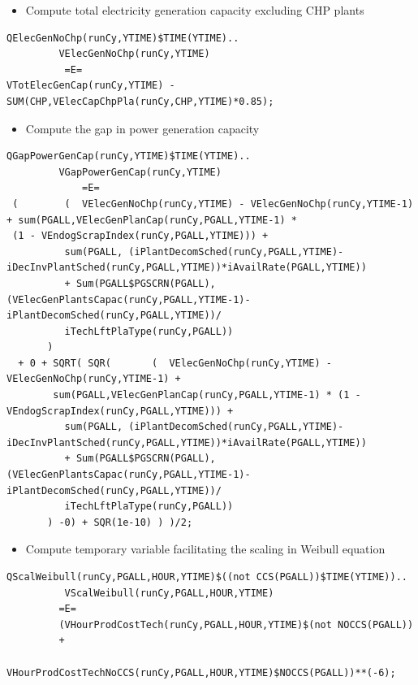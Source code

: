 \documentclass[a4paper,]{scrartcl}
\providecommand{\tightlist}{%
  \setlength{\itemsep}{0pt}\setlength{\parskip}{0pt}}
\begin{document}
\begin{itemize}
\tightlist
\item
  Compute total electricity generation capacity excluding CHP plants
\end{itemize}

\begin{lstlisting}
QElecGenNoChp(runCy,YTIME)$TIME(YTIME)..
         VElecGenNoChp(runCy,YTIME)
          =E=
VTotElecGenCap(runCy,YTIME) - SUM(CHP,VElecCapChpPla(runCy,CHP,YTIME)*0.85);      
\end{lstlisting}

\begin{itemize}
\tightlist
\item
  Compute the gap in power generation capacity
\end{itemize}

\begin{lstlisting}
QGapPowerGenCap(runCy,YTIME)$TIME(YTIME)..
         VGapPowerGenCap(runCy,YTIME)
             =E=
 (        (  VElecGenNoChp(runCy,YTIME) - VElecGenNoChp(runCy,YTIME-1) + sum(PGALL,VElecGenPlanCap(runCy,PGALL,YTIME-1) * 
 (1 - VEndogScrapIndex(runCy,PGALL,YTIME))) +
          sum(PGALL, (iPlantDecomSched(runCy,PGALL,YTIME)-iDecInvPlantSched(runCy,PGALL,YTIME))*iAvailRate(PGALL,YTIME))
          + Sum(PGALL$PGSCRN(PGALL), (VElecGenPlantsCapac(runCy,PGALL,YTIME-1)-iPlantDecomSched(runCy,PGALL,YTIME))/
          iTechLftPlaType(runCy,PGALL))
       )
  + 0 + SQRT( SQR(       (  VElecGenNoChp(runCy,YTIME) - VElecGenNoChp(runCy,YTIME-1) +
        sum(PGALL,VElecGenPlanCap(runCy,PGALL,YTIME-1) * (1 - VEndogScrapIndex(runCy,PGALL,YTIME))) +
          sum(PGALL, (iPlantDecomSched(runCy,PGALL,YTIME)-iDecInvPlantSched(runCy,PGALL,YTIME))*iAvailRate(PGALL,YTIME))
          + Sum(PGALL$PGSCRN(PGALL), (VElecGenPlantsCapac(runCy,PGALL,YTIME-1)-iPlantDecomSched(runCy,PGALL,YTIME))/
          iTechLftPlaType(runCy,PGALL))
       ) -0) + SQR(1e-10) ) )/2;
\end{lstlisting}

\begin{itemize}
\tightlist
\item
  Compute temporary variable facilitating the scaling in Weibull
  equation
\end{itemize}

\begin{lstlisting}
QScalWeibull(runCy,PGALL,HOUR,YTIME)$((not CCS(PGALL))$TIME(YTIME))..
          VScalWeibull(runCy,PGALL,HOUR,YTIME) 
         =E=
         (VHourProdCostTech(runCy,PGALL,HOUR,YTIME)$(not NOCCS(PGALL))
         +
          VHourProdCostTechNoCCS(runCy,PGALL,HOUR,YTIME)$NOCCS(PGALL))**(-6);     
\end{lstlisting}
\end{document}
